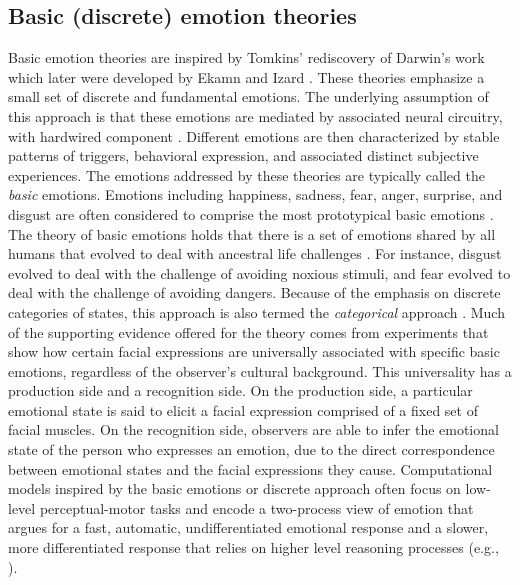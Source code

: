 \documentclass[11pt]{article}
\begin{document}
\subsection{Basic (discrete) emotion theories}
\label{sec:discrete-emotions}

Basic emotion theories are inspired by Tomkins' \cite{tomkins:affect}
rediscovery of Darwin's work
\cite{darwin:emotion-expression,hess:darwin-emotion} which later were developed
by Ekamn \cite{ekman:argument-emotions} and Izard \cite{izard:human-emotions}.
These theories emphasize a small set of discrete and fundamental emotions.
The underlying assumption of this approach is that these emotions are mediated
by associated neural circuitry, with hardwired component
\cite{ekman:argument-emotions}. Different emotions are then characterized by
stable patterns of triggers, behavioral expression, and associated distinct
subjective experiences. The emotions addressed by these theories are typically
called the \textit{basic} emotions. Emotions including happiness, sadness, fear,
anger, surprise, and disgust are often considered to comprise the most
prototypical basic emotions \cite{ekman:argument-emotions}. The theory of basic
emotions holds that there is a set of emotions shared by all humans that evolved
to deal with ancestral life challenges \cite{ekman:argument-emotions}. For
instance, disgust evolved to deal with the challenge of avoiding noxious
stimuli, and fear evolved to deal with the challenge of avoiding dangers.
Because of the emphasis on discrete categories of states, this approach is also
termed the \textit{categorical} approach \cite{panskepp:affective-neuroscience}.
Much of the supporting evidence offered for the theory comes from experiments
that show how certain facial expressions are universally associated with
specific basic emotions, regardless of the observer's cultural background. This
universality has a production side and a recognition side. On the production
side, a particular emotional state is said to elicit a facial expression
comprised of a fixed set of facial muscles. On the recognition side, observers
are able to infer the emotional state of the person who expresses an emotion,
due to the direct correspondence between emotional states and the facial
expressions they cause. Computational models inspired by the basic emotions or
discrete approach often focus on low-level perceptual-motor tasks and encode a
two-process view of emotion that argues for a fast, automatic, undifferentiated
emotional response and a slower, more differentiated response that relies on
higher level reasoning processes (e.g.,
\cite{armony:computational-modeling-emotion}).
\end{document}
